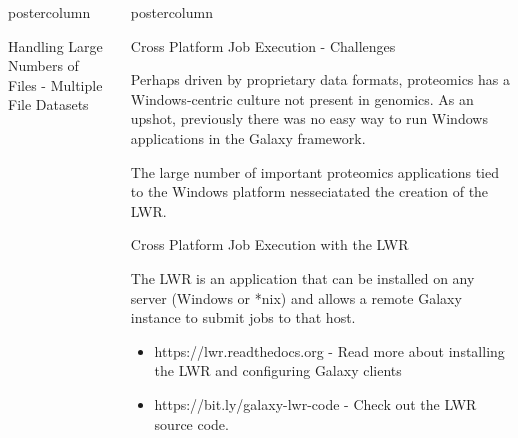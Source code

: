 \documentclass[final]{beamer}
\newlength{\columnheight}
\begin{document}
\begin{frame}
\begin{columns}
\begin{column}{.33\textwidth}
\begin{beamercolorbox}[center,wd=\textwidth]{postercolumn}
\begin{minipage}[T]{.95\textwidth}
{\begin{block}{Handling Large Numbers of Files - Multiple File Datasets}
            \end{block}
            \vfill
          }
        \end{minipage}
      \end{beamercolorbox}
    \end{column}              

    \begin{column}{.33\textwidth}
      \begin{beamercolorbox}[center,wd=\textwidth]{postercolumn}
        \begin{minipage}[T]{.95\textwidth} %
          \parbox[t][\columnheight]{\textwidth}{
            \begin{block}{Cross Platform Job Execution - Challenges}

            Perhaps driven by proprietary data formats, proteomics has a
            Windows-centric culture not present in genomics. As an upshot,
            previously there was no easy way to run Windows applications in
            the Galaxy framework.

            The large number of important proteomics applications tied to the
            Windows platform nesseciatated the creation of the LWR.


            \end{block}
            \vfill
            \begin{block}{Cross Platform Job Execution with the LWR}

            The LWR is an application that can be installed on any server
            (Windows or *nix) and allows a remote Galaxy instance to submit
            jobs to that host.

            \begin{itemize}
            \item https://lwr.readthedocs.org - Read more about installing the LWR and configuring Galaxy clients 
            \item https://bit.ly/galaxy-lwr-code - Check out the LWR source code.
            \end{itemize}


\end{block}}
\end{minipage}
\end{beamercolorbox}
\end{column}
\end{columns}
\end{frame}
\end{document}
